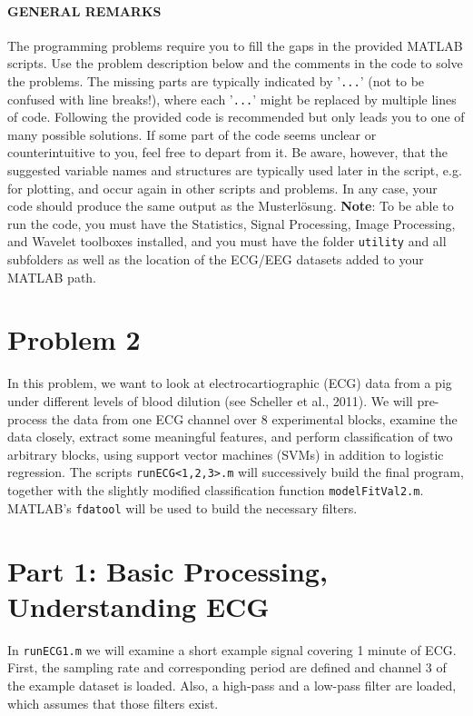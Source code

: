 \documentclass[10pt,a4paper,notitlepage]{report}
\begin{document}
\paragraph*{GENERAL REMARKS} The programming problems require you to fill the gaps in the provided MATLAB scripts. Use the problem description below and the comments in the code to solve the problems. The missing parts are typically indicated by '\texttt{...}' (not to be confused with line breaks!), where each '\texttt{...}' might be replaced by multiple lines of code. Following the provided code is recommended but only leads you to one of many possible solutions. If some part of the code seems unclear or counterintuitive to you, feel free to depart from it. Be aware, however, that the suggested variable names and structures are typically used later in the script, e.g. for plotting, and occur again in other scripts and problems. In any case, your code should produce the same output as the Musterlösung. \textbf{Note}: To be able to run the code, you must have the Statistics, Signal Processing, Image Processing, and Wavelet toolboxes installed, and you must have the folder \texttt{utility} and all subfolders as well as the location of the ECG/EEG datasets added to your MATLAB path.

\section*{Problem 2}
In this problem, we want to look at electrocartiographic (ECG) data from a pig under different levels of blood dilution (see Scheller et al., 2011). We will pre-process the data from one ECG channel over 8 experimental blocks, examine the data closely, extract some meaningful features, and perform classification of two arbitrary blocks, using support vector machines (SVMs) in addition to logistic regression. The scripts \texttt{runECG<1,2,3>.m} will successively build the final program, together with the slightly modified classification function \texttt{modelFitVal2.m}. MATLAB's \texttt{fdatool} will be used to build the necessary filters.

\section*{Part 1: Basic Processing, Understanding ECG}
In \texttt{runECG1.m} we will examine a short example signal covering 1 minute of ECG. First, the sampling rate and corresponding period are defined and channel 3 of the example dataset is loaded. Also, a high-pass and a low-pass filter are loaded, which assumes that those filters exist. 
\end{document}
